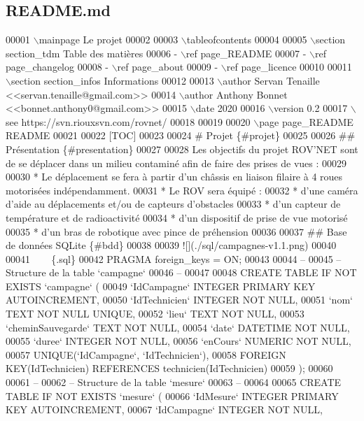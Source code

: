 \hypertarget{_r_e_a_d_m_e_8md_source}{}\subsection{R\+E\+A\+D\+M\+E.\+md}

\begin{DoxyCode}
00001 \(\backslash\)mainpage Le projet 
00002 
00003 \(\backslash\)tableofcontents
00004 
00005 \(\backslash\)section section\_tdm Table des matières
00006 - \(\backslash\)ref page\_README
00007 - \(\backslash\)ref page\_changelog
00008 - \(\backslash\)ref page\_about
00009 - \(\backslash\)ref page\_licence
00010 
00011 \(\backslash\)section section\_infos Informations
00012 
00013 \(\backslash\)author Servan Tenaille <<servan.tenaille@gmail.com>>
00014 \(\backslash\)author Anthony Bonnet <<bonnet.anthony0@gmail.com>>
00015 \(\backslash\)date 2020
00016 \(\backslash\)version 0.2
00017 \(\backslash\)see https://svn.riouxsvn.com/rovnet/
00018 
00019 
00020 \(\backslash\)page page\_README README
00021 
00022 [TOC]
00023 
00024 # Projet \{#projet\}
00025 
00026 ## Présentation \{#presentation\}
00027 
00028 Les objectifs du projet ROV'NET sont de se déplacer dans un milieu contaminé afin de faire des prises
       de vues :
00029 
00030 * Le déplacement se fera à partir d'un châssis en liaison filaire​ à 4 roues motorisées
       indépendamment.
00031 * Le ROV sera équipé :
00032     * d'une caméra d'aide au déplacements et/ou de capteurs d'obstacles
00033     * d'un capteur de température et de radioactivité
00034     * d'un dispositif de prise de vue motorisé
00035     * d'un bras de robotique avec pince de préhension
00036 
00037 ## Base de données SQLite \{#bdd\}
00038 
00039 ![](./sql/campagnes-v1.1.png)
00040 
00041 ~~~ \{.sql\}
00042 PRAGMA foreign\_keys = ON;
00043 
00044 --
00045 -- Structure de la table `campagne`
00046 --
00047 
00048 CREATE TABLE IF NOT EXISTS `campagne` (
00049    `IdCampagne`    INTEGER PRIMARY KEY AUTOINCREMENT,
00050    `IdTechnicien`  INTEGER NOT NULL,
00051    `nom`   TEXT NOT NULL UNIQUE,
00052    `lieu`  TEXT NOT NULL,
00053    `cheminSauvegarde`  TEXT NOT NULL,
00054    `date`  DATETIME NOT NULL,
00055    `duree` INTEGER NOT NULL,
00056    `enCours` NUMERIC NOT NULL,
00057    UNIQUE(`IdCampagne`, `IdTechnicien`),
00058    FOREIGN KEY(IdTechnicien) REFERENCES technicien(IdTechnicien)
00059 );
00060 
00061 --
00062 -- Structure de la table `mesure`
00063 --
00064 
00065 CREATE TABLE IF NOT EXISTS `mesure` (
00066    `IdMesure`  INTEGER PRIMARY KEY AUTOINCREMENT,
00067    `IdCampagne`    INTEGER NOT NULL,

\end{DoxyCode}
